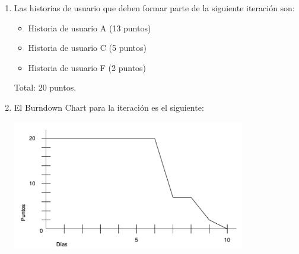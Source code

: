 \begin{solucion}
    \begin{enumerate}[label=\Alph*)]
        \item Las historias de usuario que deben formar parte de la siguiente iteración son:
        \begin{itemize}
            \item Historia de usuario A (13 puntos)
            \item Historia de usuario C (5 puntos)
            \item Historia de usuario F (2 puntos)
        \end{itemize}
        Total: 20 puntos.
        \item El Burndown Chart para la iteración es el siguiente:
        \begin{center}
            \includegraphics[width=0.8\textwidth]{../rsc/2024-ej2-bdc}
        \end{center}
    \end{enumerate}
\end{solucion}